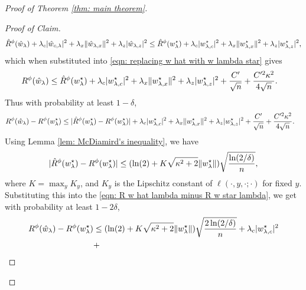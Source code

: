 \begin{proof}[Proof of Theorem \ref{thm: main theorem}]
\begin{proof}[Proof of Claim]
\begin{equation*}
\begin{aligned}
                \hat{R}^\phi(\hat{w}_\lambda) +
                \lambda_c|\hat{w}_{c,\lambda}|^2+
                \lambda_x\|\hat{w}_{\lambda,x}\|^2 +
                \lambda_z|\hat{w}_{\lambda,z}|^2 \leq
                \hat{R}^\phi(w^\star_{\lambda}) +
                \lambda_c|w^\star_{{\lambda,c}}|^2 +
                \lambda_x\|w^\star_{{\lambda,x}}\|^2 +
                \lambda_z|w^\star_{{\lambda,z}}|^2,
            \end{aligned}
        \end{equation*}
        which when substituted into \eqref{eqn: replacing w hat with w lambda star} gives
        \begin{equation*}
            \begin{aligned}
                 R^\phi(\hat{w}_\lambda) &\leq
                 \hat{R}^\phi(w^\star_{\lambda}) +
                 \lambda_c|w^\star_{{\lambda,c}}|^2 +
                 \lambda_x\|w^\star_{{\lambda,x}}\|^2 +
                 \lambda_z|w^\star_{{\lambda,z}}|^2 +  \frac{C'}{\sqrt{n}} +
                 \frac{C'^2\kappa^2}{4\sqrt{n}}.
            \end{aligned}
        \end{equation*}
        Thus with probability at least $1-\delta$,
        \begin{equation}\label{eqn: R w hat lambda minus R w star lambda}
            \begin{aligned}
                R^\phi(\hat{w}_\lambda) - R^\phi(w^\star_{\lambda}) &\leq |\hat{R}^\phi(w^\star_{\lambda}) - R^\phi(w^\star_{\lambda})| +
                \lambda_c|w^\star_{{\lambda,c}}|^2 +\lambda_x\|w^\star_{{\lambda,x}}\|^2
                +\lambda_z|w^\star_{{\lambda,z}}|^2 +  \frac{C'}{\sqrt{n}} +\frac{C'^2\kappa^2}{4\sqrt{n}}.
            \end{aligned}
        \end{equation}
        Using Lemma \ref{lem: McDiamird's inequality}, we have
        \begin{equation*}
            |\hat{R}^\phi(w^\star_{\lambda}) - R^\phi(w^\star_{\lambda})|
            \leq (\ln(2) + K\sqrt{\kappa^2+2}\|w^\star_{\lambda}\|)\sqrt{\frac{\ln(2/\delta)}{n}},
        \end{equation*}
        where $K = \max_y K_y$, and $K_y$ is the Lipschitz constant of $\ell(\cdot, y, \cdot; \cdot)$ for fixed $y$.
        Substituting this into the \eqref{eqn: R w hat lambda minus R w star lambda}, we get with probability at least $1-2\delta$,
        \begin{equation}\label{eqn: imputed risk of whl - imputed risk of wsl}
            \begin{aligned}
                R^\phi(\whl) - R^\phi(\wsl) &\leq (\ln(2) + K\sqrt{\kappa^2+2}\|\wsl\|)\sqrt{\frac{2\ln(2/\delta)}{n}} +
                \lambda_c|\wslc|^2 \\
                &+

\end{aligned}
\end{equation}
\end{proof}
\end{proof}
